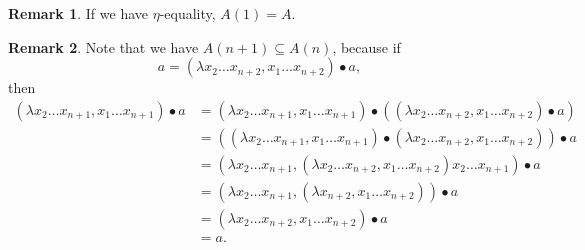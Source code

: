 \documentclass{amsbook}
\theoremstyle{definition}
\newtheorem{remark}{Remark}
\begin{document}
  \begin{remark}
    If we have $ \eta $-equality, $ A(1) = A $.
  \end{remark}

  \begin{remark}
    Note that we have $ A(n + 1) \subseteq A(n) $, because if
    \[ a = (\lambda x_2 \dots x_{n + 2}, x_1 \dots x_{n + 2}) \bullet a, \]
    then
    \begin{align*}
      (\lambda x_2 \dots x_{n + 1}, x_1 \dots x_{n + 1}) \bullet a
      &= (\lambda x_2 \dots x_{n + 1}, x_1 \dots x_{n + 1}) \bullet ((\lambda x_2 \dots x_{n + 2}, x_1 \dots x_{n + 2}) \bullet a)\\
      &= ((\lambda x_2 \dots x_{n + 1}, x_1 \dots x_{n + 1}) \bullet (\lambda x_2 \dots x_{n + 2}, x_1 \dots x_{n + 2})) \bullet a\\
      &= (\lambda x_2 \dots x_{n + 1}, (\lambda x_2 \dots x_{n + 2}, x_1 \dots x_{n + 2}) x_2 \dots x_{n + 1}) \bullet a\\
      &= (\lambda x_2 \dots x_{n + 1}, (\lambda x_{n + 2}, x_1 \dots x_{n + 2})) \bullet a\\
      &= (\lambda x_2 \dots x_{n + 2}, x_1 \dots x_{n + 2}) \bullet a\\
      &= a.
    \end{align*}
  \end{remark}
\end{document}
